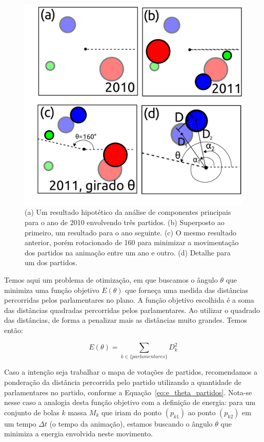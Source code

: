 \documentclass[a4paper, 12pt]{article}
\begin{document}
\begin{figure}[h]
  \centering
  \includegraphics[scale=0.5]{figs/rotacoes.pdf}
  \caption{(a) Um resultado hipotético da análise de componentes principais para o ano de 2010 envolvendo três partidos. (b) Superposto ao primeiro, um resultado para o ano seguinte. (c) O mesmo resultado anterior, porém rotacionado de 160\textdegree{} para minimizar a movimentação dos partidos na animação entre um ano e outro. (d) Detalhe para um dos partidos.}
  \label{fig:rotacoes}
\end{figure}

Temos aqui um problema de otimização, em que buscamos o ângulo $\theta$ que minimiza uma função objetivo $E(\theta)$ que forneça uma medida das distâncias percorridas pelos parlamentares no plano. A função objetivo escolhida é a soma das distâncias quadradas percorridas pelos parlamentares. Ao utilizar o quadrado das distâncias, de forma a penalizar mais as distâncias muito grandes. Temos então:

\begin{equation}
E(\theta)=\sum_{k\in\{parlamentares\}} D_{k}^{2}\label{eq:e_theta}
\end{equation}

Caso a intenção seja trabalhar o mapa de votações de partidos, recomendamos a ponderação da distância percorrida pelo partido utilizando a quantidade de parlamentares no partido, conforme a Equação~\ref{eq:e_theta_partidos}. Nota-se nesse caso a analogia desta função objetivo com a definição de energia: para um conjunto de bolas $k$ massa $M_{k}$ que iriam do ponto $(p_{k1})$ ao ponto $(p_{k2})$ em um tempo $\Delta t$ (o tempo da animação), estamos buscando o ângulo $\theta$ que minimiza a energia envolvida
neste movimento. 
\end{document}
